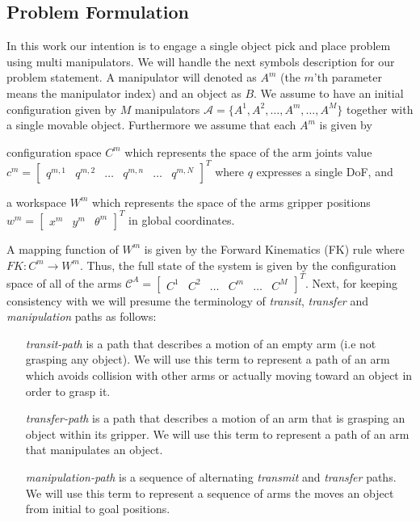 \documentclass[english]{article}
\theoremstyle{definition}
\begin{document}
\subsection{Problem Formulation}
\label{section:problem_formulation}
In this work our intention is to engage a single object pick and place problem using multi manipulators. We will handle the next symbols description for our problem statement. A manipulator will denoted as $A^{m}$ (the $m$'th parameter means the manipulator index) and an object as $B$. We assume to have an initial configuration given by $M$ manipulators  $\mathcal{A}=\{A^{1},A^{2},\dots,A^m, \dots,A^{M}\}$ together with a single movable object. Furthermore we assume that each $A^m$ is given by
\begin{inparaenum}
\item configuration space $C^{m}$ which represents the space of the arm joints value $c^{m} = \begin{bmatrix} q^{m,1} & q^{m,2} & \dots & q^{m,n} & \dots & q^{m,N} \end{bmatrix}^T$ where $q$ expresses a single DoF, and
\item a workspace $W^m$ which represents the space of the arms gripper positions $w^m= \begin{bmatrix} x^m & y^m & \theta^m \end{bmatrix}^T$ in global coordinates.
\end{inparaenum}  
A mapping function of $W^m$ is given by the Forward Kinematics (FK) rule where $FK:C^m\rightarrow W^m$. Thus, the full state of the system is given by the configuration space of all of the arms $\mathcal{C}^A=\begin{bmatrix} C^1 & C^2 & \dots & C^m & \dots & C^M\end{bmatrix}^T$. Next, for keeping consistency with \cite{koga1994multi,koga1992} we will presume the terminology of \textit{transit}, \textit{transfer} and \textit{manipulation} paths as follows:
\begin{itemize}
\item[\textit{transit-path}] is a path that describes a motion of an empty arm (i.e not grasping any object). We will use this term to represent a path of an arm which avoids collision with other arms or actually moving toward an object in order to grasp it.

\item[\textit{transfer-path}] is a path that describes a motion of an arm that is grasping an object within its gripper. We will use this term to represent a path of an arm that manipulates an object.

\item[\textit{manipulation-path}]  is a sequence of alternating \textit{transmit} and \textit{transfer} paths. We will use this term to represent a sequence of arms the moves an object from initial to goal positions.
\end{itemize}
\end{document}

